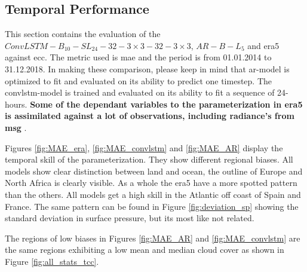 \subsection{Temporal Performance}
This section contains the evaluation of the $ConvLSTM-B_{10}-SL_{24}-32-3\times3-32-3 \times3$, $AR-B-L_5$ and \acrshort{era5} against \acrshort{ecc}. The metric used is \acrshort{mae} and the period is from 01.01.2014 to 31.12.2018. In making these comparison, please keep in mind that \acrshort{ar}-model is optimized to fit and evaluated on its ability to predict one timestep. The \acrshort{convlstm}-model is trained and evaluated on its ability to fit a sequence of 24-hours.\textbf{ Some of the dependant variables to the parameterization in \acrshort{era5} is assimilated against a lot of observations, including radiance's from \acrlong{msg}} \cite{ERA52020}.

Figures \ref{fig:MAE_era}, \ref{fig:MAE_convlstm} and \ref{fig:MAE_AR} display the temporal skill of the parameterization.%
They show different regional biases. All models show clear distinction between land and ocean, the outline of Europe and North Africa is clearly visible.
As a whole the \acrshort{era5} have a more spotted pattern than the others. All models get a high skill in the Atlantic off coast of Spain and France. The same pattern can be found in Figure \ref{fig:deviation_sp} showing the standard deviation in surface pressure, but its most like not related.

The regions of low biases in Figures \ref{fig:MAE_AR} and \ref{fig:MAE_convlstm} are the same regions exhibiting a low mean and median cloud cover as shown in Figure \ref{fig:all_stats_tcc}.

